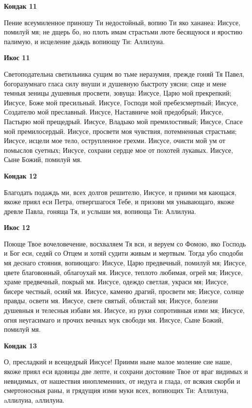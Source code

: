 \medskip
\bfseries Кондак 11\normalfont{}


Пение
всеумиленное приношу Ти недостойный, вопию Ти яко хананеа: Иисусе, помилуй мя; не дщерь бо, но плоть имам страстьми люте бесящуюся и яростию палимую, и исцеление даждь вопиющу Ти: Аллилуиа.


\medskip
\bfseries Икос 11\normalfont{}


Светоподательна
светильника сущим во тьме неразумия, прежде гоняй Тя Павел, богоразумнаго гласа силу внуши и душевную быстроту уясни; сице и мене темныя зеницы душевныя просвети, зовуща: Иисусе, Царю мой прекрепкий; Иисусе, Боже мой пресильный. Иисусе, Господи мой пребезсмертный; Иисусе, Создателю мой преславный. Иисусе, Наставниче мой предобрый; Иисусе, Пастырю мой прещедрый. Иисусе, Владыко мой премилостивый; Иисусе, Спасе мой премилосердый. Иисусе, просвети моя чувствия, потемненныя страстьми; Иисусе, исцели мое тело, острупленное грехми. Иисусе, очисти мой ум от помыслов суетных; Иисусе, сохрани сердце мое от похотей лукавых. Иисусе, Сыне Божий, помилуй мя.


\medskip
\bfseries Кондак 12\normalfont{}


Благодать
подаждь ми, всех долгов решителю, Иисусе, и приими мя кающася, якоже приял еси Петра, отвергшагося Тебе, и призови мя унывающаго, якоже древле Павла, гоняща Тя, и услыши мя, вопиюща Ти: Аллилуиа.


\medskip
\bfseries Икос 12\normalfont{}


Поюще
Твое вочеловечение, восхваляем Тя вси, и веруем со Фомою, яко Господь и Бог еси, седяй со Отцем и хотяй судити живым и мертвым. Тогда убо сподоби мя деснаго стояния, вопиющаго: Иисусе, Царю предвечный, помилуй мя; Иисусе, цвете благовонный, облагоухай мя. Иисусе, теплото любимая, огрей мя; Иисусе, храме предвечный, покрый мя. Иисусе, одеждо светлая, украси мя; Иисусе, бисере честный, осияй мя. Иисусе, каменю драгий, просвети мя; Иисусе, солнце правды, освети мя. Иисусе, свете святый, облистай мя; Иисусе, болезни душевныя и телесныя избави мя. Иисусе, из руки сопротивныя изми мя; Иисусе, огня неугасимаго и прочих вечных мук свободи мя. Иисусе, Сыне Божий, помилуй мя. 


\medskip
\bfseries Кондак 13\normalfont{}


О,
пресладкий и всещедрый Иисусе! Приими ныне малое моление сие наше, якоже приял еси вдовицы две лепте, и сохрани достояние Твое от враг видимых и невидимых, от нашествия иноплеменних, от недуга и глада, от всякия скорби и смертоносныя раны, и грядущия изми муки всех, вопиющих Ти: Аллилуиа, aллилуиа, aллилуиа.


